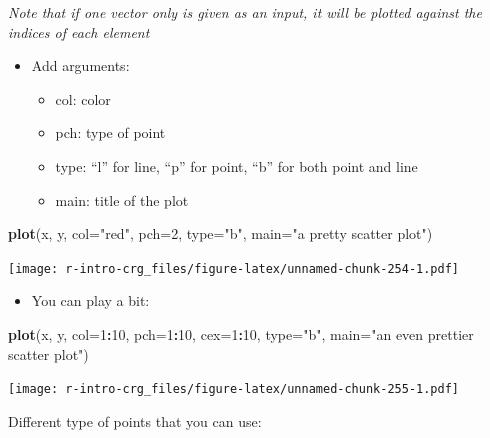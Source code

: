 \documentclass[]{book}
\newenvironment{Shaded}{\begin{snugshade}}{\end{snugshade}}
\newcommand{\DataTypeTok}[1]{\textcolor[rgb]{0.13,0.29,0.53}{#1}}
\newcommand{\DecValTok}[1]{\textcolor[rgb]{0.00,0.00,0.81}{#1}}
\newcommand{\KeywordTok}[1]{\textcolor[rgb]{0.13,0.29,0.53}{\textbf{#1}}}
\newcommand{\NormalTok}[1]{#1}
\newcommand{\OperatorTok}[1]{\textcolor[rgb]{0.81,0.36,0.00}{\textbf{#1}}}
\newcommand{\StringTok}[1]{\textcolor[rgb]{0.31,0.60,0.02}{#1}}
\providecommand{\tightlist}{%
  \setlength{\itemsep}{0pt}\setlength{\parskip}{0pt}}
\begin{document}
\emph{Note that if one vector only is given as an input, it will be plotted against the indices of each element}

\begin{itemize}
\tightlist
\item
  Add arguments:

  \begin{itemize}
  \tightlist
  \item
    col: color
  \item
    pch: type of point
  \item
    type: ``l'' for line, ``p'' for point, ``b'' for both point and line
  \item
    main: title of the plot
  \end{itemize}
\end{itemize}

\begin{Shaded}
\begin{Highlighting}[]
\KeywordTok{plot}\NormalTok{(x, y, }
    \DataTypeTok{col=}\StringTok{"red"}\NormalTok{, }
    \DataTypeTok{pch=}\DecValTok{2}\NormalTok{, }
    \DataTypeTok{type=}\StringTok{"b"}\NormalTok{, }
    \DataTypeTok{main=}\StringTok{"a pretty scatter plot"}\NormalTok{)}
\end{Highlighting}
\end{Shaded}

\texttt{[image: r-intro-crg\_files/figure-latex/unnamed-chunk-254-1.pdf]}

\begin{itemize}
\tightlist
\item
  You can play a bit:
\end{itemize}

\begin{Shaded}
\begin{Highlighting}[]
\KeywordTok{plot}\NormalTok{(x, y, }
    \DataTypeTok{col=}\DecValTok{1}\OperatorTok{:}\DecValTok{10}\NormalTok{, }
    \DataTypeTok{pch=}\DecValTok{1}\OperatorTok{:}\DecValTok{10}\NormalTok{, }
    \DataTypeTok{cex=}\DecValTok{1}\OperatorTok{:}\DecValTok{10}\NormalTok{, }
    \DataTypeTok{type=}\StringTok{"b"}\NormalTok{, }
    \DataTypeTok{main=}\StringTok{"an even prettier scatter plot"}\NormalTok{)}
\end{Highlighting}
\end{Shaded}

\texttt{[image: r-intro-crg\_files/figure-latex/unnamed-chunk-255-1.pdf]}

Different type of points that you can use:
\end{document}

